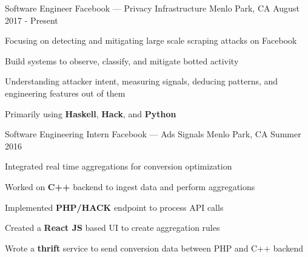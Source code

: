 


\begin{cventries}


\cventry
{Software Engineer} %
{{\color{facebookblue}Facebook} --- Privacy Infrastructure} %
{Menlo Park, CA} %
{August 2017 - Present} %
{ %
\begin{cvitems}
\item {Focusing on detecting and mitigating large scale scraping attacks on Facebook}
\item {Build systems to observe, classify, and mitigate botted activity}
\item {Understanding attacker intent, measuring signals, deducing patterns, and engineering features out of them}
\item {Primarily using \textbf{Haskell}, \textbf{Hack}, and \textbf{Python}}
\end{cvitems}
}


\cventry
{Software Engineering Intern} %
{{\color{facebookblue}Facebook} --- Ads Signals} %
{Menlo Park, CA} %
{Summer 2016} %
{ %
\begin{cvitems}
\item {Integrated real time aggregations for conversion optimization}
\item {Worked on \textbf{C++} backend to ingest data and perform aggregations}
\item {Implemented \textbf{PHP/HACK} endpoint to process API calls}
\item {Created a \textbf{React JS} based UI to create aggregation rules}
\item {Wrote a \textbf{thrift} service to send conversion data between PHP and C++ backend}
\end{cvitems}
}


\end{cventries}
